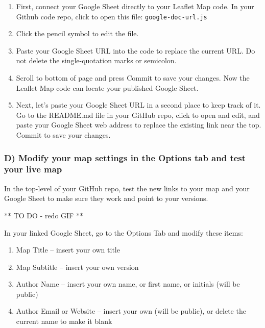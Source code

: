 \documentclass[
  english,
]{book}
\begin{document}
\begin{enumerate}
\def\labelenumi{\arabic{enumi})}
\item
  First, connect your Google Sheet directly to your Leaflet Map code. In your Github code repo, click to open this file: \texttt{google-doc-url.js}
\item
  Click the pencil symbol to edit the file.
\item
  Paste your Google Sheet URL into the code to replace the current URL. Do not delete the single-quotation marks or semicolon.
\item
  Scroll to bottom of page and press Commit to save your changes. Now the Leaflet Map code can locate your published Google Sheet.
\item
  Next, let's paste your Google Sheet URL in a second place to keep track of it. Go to the README.md file in your GitHub repo, click to open and edit, and paste your Google Sheet web address to replace the existing link near the top. Commit to save your changes.
\end{enumerate}

\hypertarget{d-modify-your-map-settings-in-the-options-tab-and-test-your-live-map-1}{%
\subsubsection*{D) Modify your map settings in the Options tab and test your live map}\label{d-modify-your-map-settings-in-the-options-tab-and-test-your-live-map-1}}

In the top-level of your GitHub repo, test the new links to your map and your Google Sheet to make sure they work and point to your versions.

** TO DO - redo GIF **

In your linked Google Sheet, go to the Options Tab and modify these items:

\begin{enumerate}
\def\labelenumi{\arabic{enumi})}
\item
  Map Title -- insert your own title
\item
  Map Subtitle -- insert your own version
\item
  Author Name -- insert your own name, or first name, or initials (will be public)
\item
  Author Email or Website -- insert your own (will be public), or delete the current name to make it blank
\end{enumerate}
\end{document}
